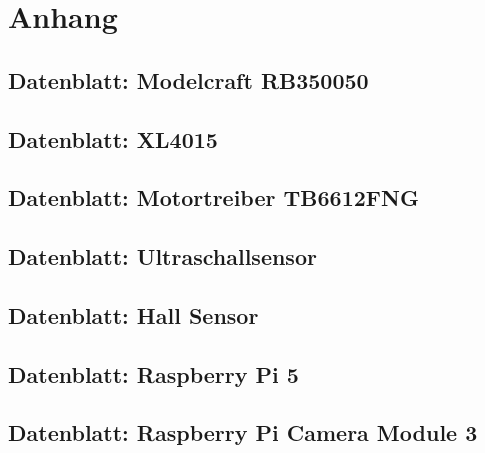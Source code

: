 
\chapter{Anhang}

\section{Datenblatt: Modelcraft RB350050}
\label{sec:datenblatt-motor}


\section{Datenblatt: XL4015}
\label{sec:datenblatt-xl4015}


\section{Datenblatt: Motortreiber TB6612FNG}
\label{sec:datenblatt-tb6612fng}


\section{Datenblatt: Ultraschallsensor}
\label{sec:datenblatt-ultraschallsensor}


\section{Datenblatt: Hall Sensor}
\label{sec:datenblatt-hall-sensor}


\section{Datenblatt: Raspberry Pi 5}
\label{sec:datenblatt-raspberry-pi-5}


\section{Datenblatt: Raspberry Pi Camera Module 3}
\label{sec:datenblatt-raspberry-pi-camera-module-3}


